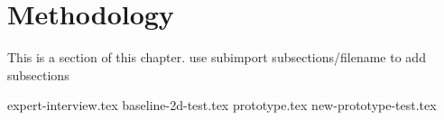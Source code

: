 
\section{Methodology}
This is a section of this chapter.
use subimport {subsections/}{filename} to add subsections

{expert-interview.tex}
{baseline-2d-test.tex}
{prototype.tex}
{new-prototype-test.tex}
